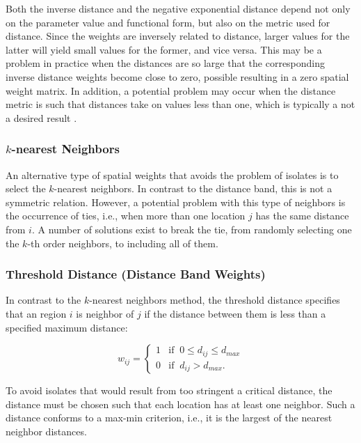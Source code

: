 \documentclass[english,12pt]{book}\usepackage[]{graphicx}\usepackage[]{xcolor}
\begin{document}
Both the inverse distance and the negative exponential distance depend not only on the parameter value and functional form, but also on the metric used for distance. Since the weights are inversely related to distance, larger values for the latter will yield small values for the former, and vice versa. This may be a problem in practice when the distances are so large that the corresponding inverse distance weights become close to zero, possible resulting in a zero spatial weight matrix. In addition, a potential problem may occur when the distance metric is such that distances take on values less than one, which is typically a not a desired result \citep{anselin2014modern}. 

\subsubsection{$k$-nearest Neighbors}

An alternative type of spatial weights that avoids the problem of isolates is to select the $k$-nearest neighbors. In contrast to the distance band, this is not a symmetric relation. However, a potential problem with this type of neighbors is the occurrence of ties, i.e., when more than one location $j$ has the same distance from $i$. A number of solutions exist to break the tie, from randomly selecting one the $k$-th order neighbors, to including all of them. 

\subsubsection{Threshold Distance (Distance Band Weights)}

In contrast to the $k$-nearest neighbors method, the threshold distance specifies that an region $i$ is neighbor of $j$ if the distance between them is less than a specified maximum distance:


\begin{equation*}
  w_{ij}= 
   \begin{cases}
      1 & \mbox{if}\;\; 0\leq d_{ij} \leq d_{max} \\ 
      0 & \mbox{if}\;\; d_{ij} > d_{max}.
   \end{cases}
\end{equation*}


To avoid isolates that would result from too stringent a critical distance, the distance must be chosen such that each location has at least one neighbor. Such a distance conforms to a max-min criterion, i.e., it is the largest of the nearest neighbor distances.
\end{document}
